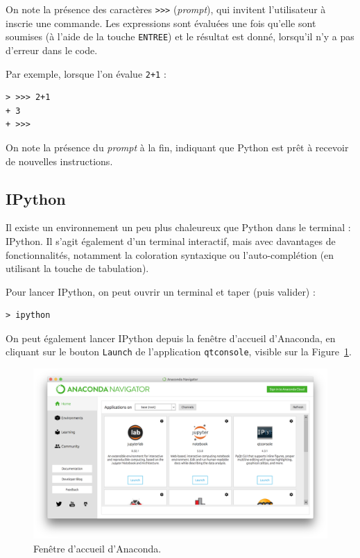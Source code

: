 \documentclass[12pt,]{book}
\numberwithin{equation}{section}
\numberwithin{countremarque}{section}
\begin{document}
On note la présence des caractères
\texttt{\textgreater{}\textgreater{}\textgreater{}} (\emph{prompt}), qui
invitent l'utilisateur à inscrie une commande. Les expressions sont
évaluées une fois qu'elle sont soumises (à l'aide de la touche
\texttt{ENTREE}) et le résultat est donné, lorsqu'il n'y a pas d'erreur
dans le code.

Par exemple, lorsque l'on évalue \texttt{2+1} :

\begin{lstlisting}
> >>> 2+1
+ 3
+ >>>
\end{lstlisting}

On note la présence du \emph{prompt} à la fin, indiquant que Python est
prêt à recevoir de nouvelles instructions.

\subsection{IPython}\label{ipython}

Il existe un environnement un peu plus chaleureux que Python dans le
terminal : IPython. Il s'agit également d'un terminal interactif, mais
avec davantages de fonctionnalités, notamment la coloration syntaxique
ou l'auto-complétion (en utilisant la touche de tabulation).

Pour lancer IPython, on peut ouvrir un terminal et taper (puis valider)
:

\begin{lstlisting}
> ipython
\end{lstlisting}

On peut également lancer IPython depuis la fenêtre d'accueil d'Anaconda,
en cliquant sur le bouton \texttt{Launch} de l'application
\texttt{qtconsole}, visible sur la
Figure~\ref{fig:intro-anaconda-navigator}.

\begin{figure}[H]

{\centering \includegraphics[width=1\linewidth]{figs/anaconda_navigator} 

}

\caption{Fenêtre d'accueil d'Anaconda.}\label{fig:intro-anaconda-navigator}
\end{figure}
\end{document}
